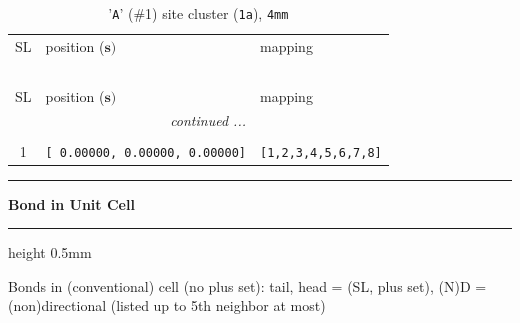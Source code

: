 \documentclass[fleqn,10pt,landscape]{jsarticle}
\begin{document}
\renewcommand{\arraystretch}{1.6}
\begin{longtable}[l]{cll}
\captionsetup{justification=raggedright, singlelinecheck=off}
\caption{'\texttt{A}' (\#1) site cluster (\texttt{1a}), \texttt{4mm}}
 \\
 \hline \hline
SL & position ($\bm{s})$ & mapping \\ \hline \endfirsthead

\multicolumn{2}{l}{\tablename\ \thetable{}} \\
 \hline \hline
SL & position ($\bm{s})$ & mapping \\ \hline \endhead

 \hline \hline
\multicolumn{2}{r}{\footnotesize\it continued ...} \\ \endfoot

 \hline \hline
\multicolumn{2}{r}{} \\ \endlastfoot

1 & \texttt{[ 0.00000, 0.00000, 0.00000]} & \texttt{[1,2,3,4,5,6,7,8]} \\
\end{longtable}
\vspace{5mm}
\noindent \rule[0.5mm]{5mm}{0.5mm}\hspace{3mm}\textbf{Bond in Unit Cell}\hspace{3mm}\leaders\hrule height 0.5mm\hfill\kern0pt
\vspace{3mm}

\noindent Bonds in (conventional) cell (no plus set): tail, head = (SL, plus set), (N)D = (non)directional (listed up to 5th neighbor at most)
\end{document}
